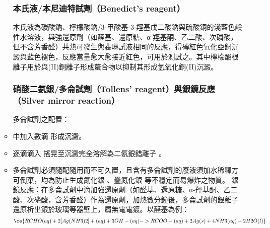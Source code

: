 \documentclass[a4paper,12pt]{report}
\begin{document}
\begin{itemize}
\begin{itemize}
\subsubsection{本氏液/本尼迪特試劑（Benedict's reagent）}
本氏液為碳酸鈉、檸檬酸鈉/3-甲酸基-3-羥基戊二酸鈉與硫酸銅的淺藍色鹼性水溶液，與強還原劑（如醛基、還原糖、α-羥基酮、乙二酸、次磷酸，但不含芳香醛）共熱可發生與裴琳試液相同的反應，得磚紅色氧化亞銅沉澱與藍色褪色，反應當量愈大愈接近紅色，可用於測試之。其中檸檬酸根離子用於與(II)銅離子形成螯合物以抑制其形成氫氧化銅(II)沉澱。
\subsubsection{硝酸二氨銀/多侖試劑（Tollens' reagent）與銀鏡反應（Silver mirror reaction）}
多侖試劑之配置：
\ben
\item {} 中加入數滴  形成沉澱。
\item 逐滴滴入  搖晃至沉澱完全溶解為二氨銀錯離子 \ce{[Ag(NH3)2]+}。
\item 多侖試劑必須隨配隨用而不可久置，且含有多侖試劑的廢液須加水稀釋方可倒棄，均為防止生成氮化銀  、疊氮化銀  等不穩定而易爆炸之物質。
\een
銀鏡反應：在多侖試劑中滴加強還原劑（如醛基、還原糖、α-羥基酮、乙二酸、次磷酸，含芳香醛）作為還原劑，加熱數分鐘後，多侖試劑的銀離子還原析出銀於玻璃等器壁上，屬無電電鍍。以醛基為例：
\[\ce{RCHO(aq) + 2[Ag(NH3)2]+(aq) + 3OH-(aq) -> RCOO-(aq) + 2Ag(s) + 4NH3(aq) + 2H2O(l)}\]

\end{itemize}
\end{itemize}
\end{document}
